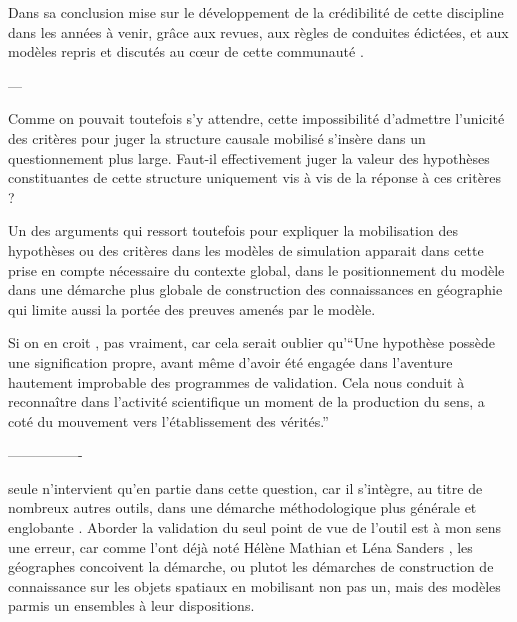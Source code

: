 
Dans sa conclusion \autocite{Rouchier2013} mise sur le développement de la crédibilité de cette discipline dans les années à venir, grâce aux revues, aux règles de conduites édictées, et aux modèles repris et discutés au cœur de cette communauté \autocite{Hales2003}.





---




Comme on pouvait toutefois s'y attendre, cette impossibilité d'admettre l'unicité des critères pour juger la structure causale mobilisé s'insère dans un questionnement plus large. Faut-il effectivement juger la valeur des hypothèses constituantes de cette structure uniquement vis à vis de la réponse à ces critères ?

Un des arguments qui ressort toutefois pour expliquer la mobilisation des hypothèses ou des critères dans les modèles de simulation apparait dans cette prise en compte nécessaire du contexte global, dans le positionnement du modèle dans une démarche plus globale de construction des connaissances en géographie qui limite aussi la portée des preuves amenés par le modèle.


Si on en croit \textcite[17]{Besse2000}, pas vraiment, car cela serait oublier qu'\enquote{Une hypothèse possède une signification propre, avant même d’avoir été engagée dans l’aventure hautement improbable des programmes de validation. Cela nous conduit à reconnaître dans l’activité scientifique un moment de la production du sens, a coté du mouvement vers l’établissement des vérités.}





















----------------

seule n'intervient qu'en partie dans cette question, car il s'intègre, au titre de nombreux autres outils, dans une démarche méthodologique plus générale et englobante \autocite{}. Aborder la validation du seul point de vue de l'outil est à mon sens une erreur, car comme l'ont déjà noté Hélène Mathian et Léna Sanders , les géographes concoivent la démarche, ou plutot les démarches de construction de connaissance sur les objets spatiaux en mobilisant non pas un, mais des modèles parmis un ensembles à leur dispositions. 

